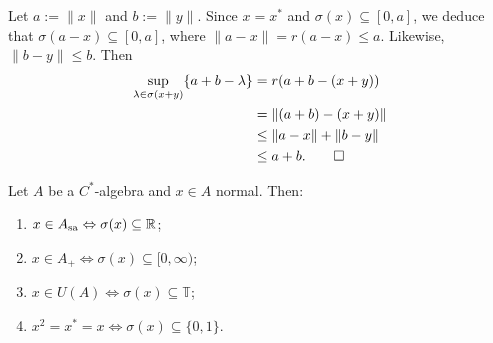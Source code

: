 \begin{myproof}
  Let $a := \| x\|$ and $b := \|y\|$.
  Since $x = x^*$ and $\sigma(x) \subseteq [0, a]$, we deduce that $\sigma(a - x) \subseteq [0, a]$,
  where $\| a - x\| = r(a - x) \leq a$. Likewise, $\|b - y\| \leq b$.
  Then 
  \begin{align*}
    \sup_{\lambda \in \sigma(x + y)} \{a + b - \lambda\} &= r(a + b - (x + y))\\
    &= \|(a + b) - (x + y)\|\\
    &\leq \|a - x\| + \|b - y\|\\
    &\leq a + b. \qedhere
  \end{align*}
\end{myproof}

\begin{theorem}
  Let $A$ be a $C^*$-algebra and $x \in A$ normal. Then:
  \begin{enumerate}
    \item $x \in A_{\operatorname{sa}} \Leftrightarrow \sigma(x) \subseteq \mathbb {R}$;
    \item $x \in A_+ \Leftrightarrow \sigma (x) \subseteq [0, \infty)$;
    \item $x \in U(A) \Leftrightarrow \sigma(x) \subseteq \mathbb{T}$;
    \item $x^2 = x^* = x \Leftrightarrow \sigma(x) \subseteq \{0, 1\}$.
  \end{enumerate}
\end{theorem}

